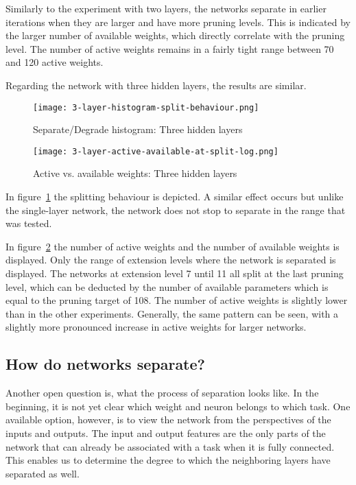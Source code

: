 Similarly to the experiment with two layers, the networks separate in earlier iterations when they are larger and have more pruning levels.
This is indicated by the larger number of available weights, which directly correlate with the pruning level.
The number of active weights remains in a fairly tight range between 70 and 120 active weights.

Regarding the network with three hidden layers, the results are similar.
\begin{figure}[ht]
    \centering
    \texttt{[image: 3-layer-histogram-split-behaviour.png]}
    \caption{
        Separate/Degrade histogram: Three hidden layers
    }\label{fig:3layer-histogram}
\end{figure}

\begin{figure}[ht] 
    \centering
    \texttt{[image: 3-layer-active-available-at-split-log.png]}
    \caption{
        Active vs. available weights: Three hidden layers
    }\label{fig:3layer-active}
\end{figure}

In figure~\ref{fig:3layer-histogram} the splitting behaviour is depicted.
A similar effect occurs but unlike the single-layer network, the network does not stop to separate in the range that was tested. 

In figure~\ref{fig:3layer-active} the number of active weights and the number of available weights is displayed.
Only the range of extension levels where the network is separated is displayed.
The networks at extension level 7 until 11 all split at the last pruning level, which can be deducted by the number of available parameters which is equal to the pruning target of 108.
The number of active weights is slightly lower than in the other experiments.
Generally, the same pattern can be seen, with a slightly more pronounced increase in active weights for larger networks.

\subsection{How do networks separate?}
Another open question is, what the process of separation looks like.
In the beginning, it is not yet clear which weight and neuron belongs to which task.
One available option, however, is to view the network from the perspectives of the inputs and outputs.
The input and output features are the only parts of the network that can already be associated with a task when it is fully connected.
This enables us to determine the degree to which the neighboring layers have separated as well.

